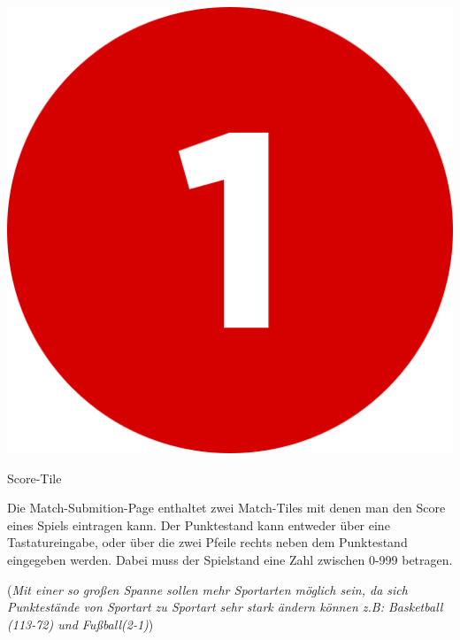 \bigskip
\includegraphics[scale=0.05]{pics/user-guide/numbers/number-1.png} \begin{LARGE} Score-Tile \end{LARGE}

Die Match-Submition-Page enthaltet zwei Match-Tiles mit denen man den Score eines Spiels eintragen kann.
Der Punktestand kann entweder über eine Tastatureingabe, oder über die zwei Pfeile rechts neben dem Punktestand eingegeben werden.
Dabei muss der Spielstand eine Zahl zwischen 0-999 betragen.

(\textit{Mit einer so großen Spanne sollen mehr Sportarten möglich sein, da sich Punktestände von Sportart zu Sportart sehr stark ändern können z.B: Basketball (113-72) und Fußball(2-1)})

